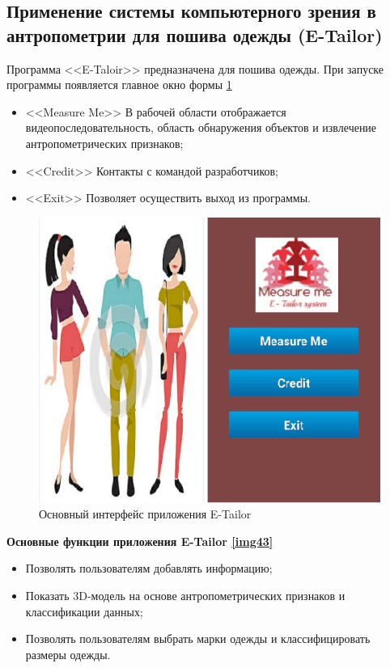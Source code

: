 \subsection{Применение системы компьютерного зрения в антропометрии для пошива одежды (E-Tailor)}
Программа <<E-Taloir>> предназначена для пошива одежды.
При запуске программы появляется главное окно формы \ref{img42}

\begin{itemize}
\item <<Measure Me>> В рабочей области отображается видеопоследовательность, область обнаружения объектов и извлечение антропометрических признаков;
\item <<Credit>> Контакты с командой разработчиков;
\item <<Exit>> Позволяет осуществить выход из программы.
\end{itemize}

\begin{figure}[ht!]
\centering
\includegraphics [scale=0.5] {images/h42.png}
\begin{center}
\caption{Основный интерфейс приложения E-Tailor} \label{img42}
\end{center}
\end{figure}
\textbf{Основные функции приложения E-Tailor \ref{img43}}

\begin{itemize}
	\item Позволять пользователям добавлять информацию;
	\item Показать 3D-модель на основе антропометрических признаков и классификации данных;
	\item Позволять пользователям выбрать марки одежды и классифицировать размеры одежды.
\end{itemize}

